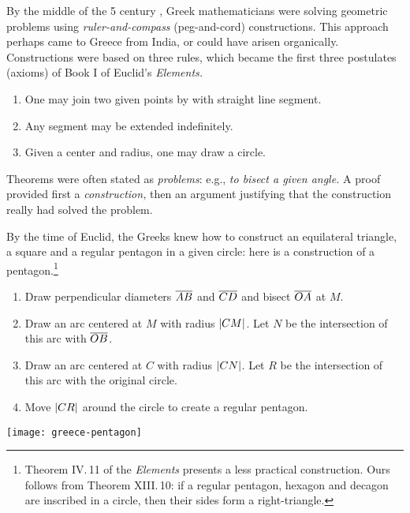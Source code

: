\label{pg:construction}

By the middle of the 5\th{} century \!\BC, Greek mathematicians were solving geometric problems using \emph{ruler-and-compass} (peg-and-cord) constructions. This approach perhaps came to Greece from India, or could have arisen organically. Constructions were based on three rules, which became the first three postulates (axioms) of Book I of Euclid's \emph{Elements.}\vspace{-1pt}
\begin{enumerate}\itemsep0pt
  \item One may join two given points by with straight line segment.
  \item Any segment may be extended indefinitely.
  \item Given a center and radius, one may draw a circle.
\end{enumerate}\vspace{-1pt}
Theorems were often stated as \emph{problems}: e.g., \emph{to bisect a given angle.} A proof provided first a \emph{construction,} then an argument justifying that the construction really had solved the problem.\smallbreak 

By the time of Euclid, the Greeks knew how to construct an equilateral triangle, a square and a regular pentagon in a given circle: here is a construction of a pentagon.\footnote{Theorem IV.\,11 of the \emph{Elements} presents a less practical construction. Ours follows from Theorem XIII.\,10: if a regular pentagon, hexagon and decagon are inscribed in a circle, then their sides form a right-triangle.}

\begin{minipage}[t]{0.69\linewidth}\vspace{-8pt}
	\begin{enumerate}\itemsep0pt
	  \item Draw perpendicular diameters $\overline{AB}$ and $\overline{CD}$ and bisect $\overline{OA}$ at $M$.
	  \item Draw an arc centered at $M$ with radius $\left| CM\right|$. Let $N$ be the intersection of this arc with $\overline{OB}$.
	  \item Draw an arc centered at $C$ with radius $\left| CN\right|$. Let $R$ be the intersection of this arc with the original circle.
		\item Move $\left| CR\right|$ around the circle to create a regular pentagon.
	\end{enumerate}
\end{minipage}
\hfill
\begin{minipage}[t]{0.3\linewidth}\vspace{-22pt}
	\flushright
	\texttt{[image: greece-pentagon]}
\end{minipage}
\smallbreak


